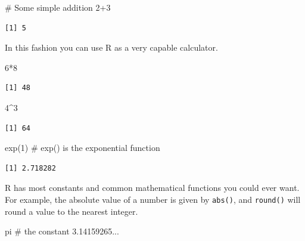 \documentclass[
  letterpaper,
  DIV=11,
  numbers=noendperiod]{scrreprt}
\newenvironment{Shaded}{\begin{snugshade}}{\end{snugshade}}
\newcommand{\CommentTok}[1]{\textcolor[rgb]{0.37,0.37,0.37}{#1}}
\newcommand{\DecValTok}[1]{\textcolor[rgb]{0.68,0.00,0.00}{#1}}
\newcommand{\FunctionTok}[1]{\textcolor[rgb]{0.28,0.35,0.67}{#1}}
\newcommand{\NormalTok}[1]{\textcolor[rgb]{0.00,0.23,0.31}{#1}}
\newcommand{\SpecialCharTok}[1]{\textcolor[rgb]{0.37,0.37,0.37}{#1}}
\begin{document}
\begin{Shaded}
\begin{Highlighting}[]
\CommentTok{\# Some simple addition}
\DecValTok{2}\SpecialCharTok{+}\DecValTok{3}
\end{Highlighting}
\end{Shaded}

\begin{verbatim}
[1] 5
\end{verbatim}

In this fashion you can use R as a very capable calculator.

\begin{Shaded}
\begin{Highlighting}[]
\DecValTok{6}\SpecialCharTok{*}\DecValTok{8}
\end{Highlighting}
\end{Shaded}

\begin{verbatim}
[1] 48
\end{verbatim}

\begin{Shaded}
\begin{Highlighting}[]
\DecValTok{4}\SpecialCharTok{\^{}}\DecValTok{3}
\end{Highlighting}
\end{Shaded}

\begin{verbatim}
[1] 64
\end{verbatim}

\begin{Shaded}
\begin{Highlighting}[]
\FunctionTok{exp}\NormalTok{(}\DecValTok{1}\NormalTok{)   }\CommentTok{\# exp() is the exponential function}
\end{Highlighting}
\end{Shaded}

\begin{verbatim}
[1] 2.718282
\end{verbatim}

R has most constants and common mathematical functions you could ever
want. For example, the absolute value of a number is given by
\texttt{abs()}, and \texttt{round()} will round a value to the nearest
integer.

\begin{Shaded}
\begin{Highlighting}[]
\NormalTok{pi     }\CommentTok{\# the constant 3.14159265...}
\end{Highlighting}
\end{Shaded}
\end{document}
